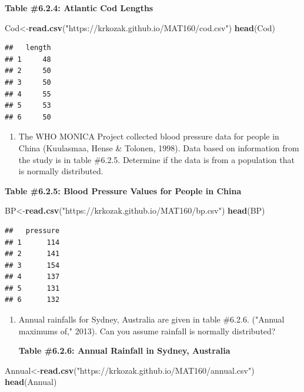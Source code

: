\documentclass[]{book}
\newenvironment{Shaded}{\begin{snugshade}}{\end{snugshade}}
\newcommand{\KeywordTok}[1]{\textcolor[rgb]{0.13,0.29,0.53}{\textbf{#1}}}
\newcommand{\NormalTok}[1]{#1}
\newcommand{\StringTok}[1]{\textcolor[rgb]{0.31,0.60,0.02}{#1}}
\providecommand{\tightlist}{%
  \setlength{\itemsep}{0pt}\setlength{\parskip}{0pt}}
\begin{document}
\textbf{Table \#6.2.4: Atlantic Cod Lengths}

\begin{Shaded}
\begin{Highlighting}[]
\NormalTok{Cod<-}\KeywordTok{read.csv}\NormalTok{(}\StringTok{"https://krkozak.github.io/MAT160/cod.csv"}\NormalTok{)}
\KeywordTok{head}\NormalTok{(Cod)}
\end{Highlighting}
\end{Shaded}

\begin{verbatim}
##   length
## 1     48
## 2     50
## 3     50
## 4     55
## 5     53
## 6     50
\end{verbatim}

\begin{enumerate}
\def\labelenumi{\arabic{enumi}.}
\setcounter{enumi}{2}
\tightlist
\item
  The WHO MONICA Project collected blood pressure data for people in China (Kuulasmaa, Hense \& Tolonen, 1998). Data based on information from the study is in table \#6.2.5. Determine if the data is from a population that is normally distributed.
\end{enumerate}

\textbf{Table \#6.2.5: Blood Pressure Values for People in China}

\begin{Shaded}
\begin{Highlighting}[]
\NormalTok{BP<-}\KeywordTok{read.csv}\NormalTok{(}\StringTok{"https://krkozak.github.io/MAT160/bp.csv"}\NormalTok{)}
\KeywordTok{head}\NormalTok{(BP)}
\end{Highlighting}
\end{Shaded}

\begin{verbatim}
##   pressure
## 1      114
## 2      141
## 3      154
## 4      137
## 5      131
## 6      132
\end{verbatim}

\begin{enumerate}
\def\labelenumi{\arabic{enumi}.}
\setcounter{enumi}{3}
\item
  Annual rainfalls for Sydney, Australia are given in table \#6.2.6. ("Annual maximums of," 2013). Can you assume rainfall is normally distributed?

  \textbf{Table \#6.2.6: Annual Rainfall in Sydney, Australia}
\end{enumerate}

\begin{Shaded}
\begin{Highlighting}[]
\NormalTok{Annual<-}\KeywordTok{read.csv}\NormalTok{(}\StringTok{"https://krkozak.github.io/MAT160/annual.csv"}\NormalTok{)}
\KeywordTok{head}\NormalTok{(Annual)}
\end{Highlighting}
\end{Shaded}
\end{document}
